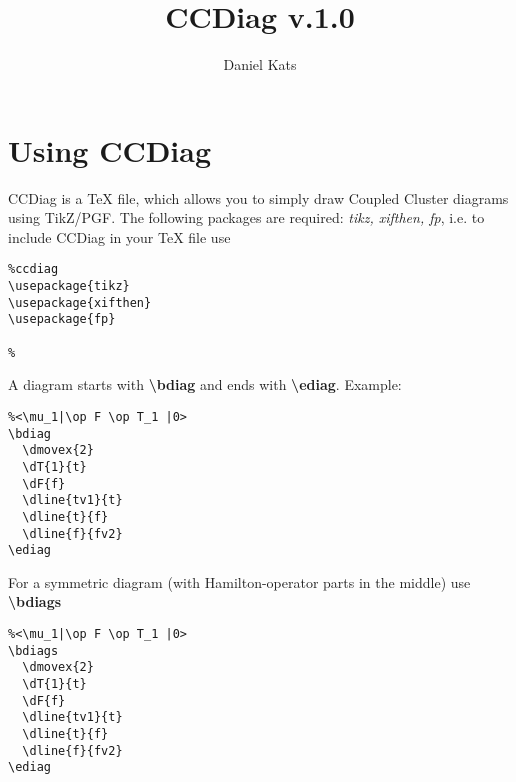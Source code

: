 \documentclass[a4paper]{article}
\begin{document}
\author{Daniel Kats}
\title{CCDiag v.1.0}
\maketitle

\section{Using CCDiag}

CCDiag is a TeX file, which allows you to simply draw Coupled Cluster diagrams using TikZ/PGF.
The following packages are required: {\it tikz, xifthen, fp}, i.e. to include CCDiag in your TeX file use
\begin{lstlisting}
%ccdiag
\usepackage{tikz}
\usepackage{xifthen}
\usepackage{fp}

%  
\end{lstlisting}

A diagram starts with {\bf \textbackslash bdiag} and ends with {\bf \textbackslash ediag}. Example:

\begin{table}[ht]
 \begin{minipage}[b]{0.5\linewidth}\centering
  \begin{lstlisting}
%<\mu_1|\op F \op T_1 |0>
\bdiag
  \dmovex{2}
  \dT{1}{t}
  \dF{f}
  \dline{tv1}{t}
  \dline{t}{f}
  \dline{f}{fv2}
\ediag 
  \end{lstlisting}
 \end{minipage}
 \begin{minipage}[b]{0.5\linewidth}\centering
    \bdiag
    \ediag
 \end{minipage}
\end{table}

For a symmetric diagram (with Hamilton-operator parts in the middle) use {\bf \textbackslash bdiags}
\begin{table}[ht]
 \begin{minipage}[b]{0.5\linewidth}\centering
  \begin{lstlisting}
%<\mu_1|\op F \op T_1 |0>
\bdiags
  \dmovex{2}
  \dT{1}{t}
  \dF{f}
  \dline{tv1}{t}
  \dline{t}{f}
  \dline{f}{fv2}
\ediag 
  \end{lstlisting}
 \end{minipage}
 \begin{minipage}[b]{0.5\linewidth}\centering
    \bdiags
    \ediag
 \end{minipage}
\end{table}
\end{document}
